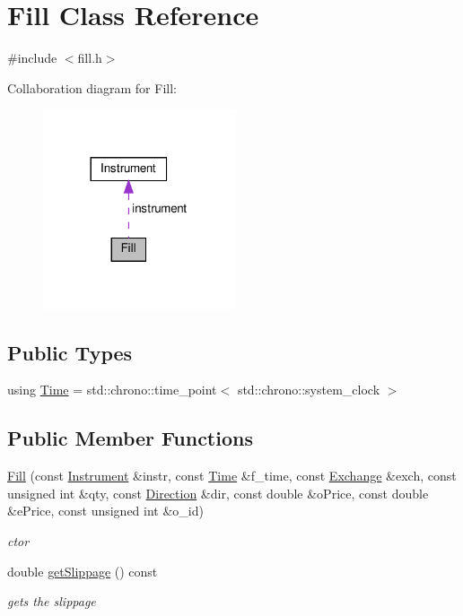 \hypertarget{classFill}{}\section{Fill Class Reference}
\label{classFill}


{\ttfamily \#include $<$fill.\+h$>$}



Collaboration diagram for Fill\+:\nopagebreak
\begin{figure}[H]
\begin{center}
\leavevmode
\includegraphics[width=161pt]{classFill__coll__graph}
\end{center}
\end{figure}
\subsection*{Public Types}
\begin{DoxyCompactItemize}
\item 
using \hyperlink{classFill_ab2f91079415160baf6bae4ce4e651882}{Time} = std\+::chrono\+::time\+\_\+point$<$ std\+::chrono\+::system\+\_\+clock $>$
\end{DoxyCompactItemize}
\subsection*{Public Member Functions}
\begin{DoxyCompactItemize}
\item 
\hyperlink{classFill_ac7abcfc5d69d92624d820ac2c54b26a9}{Fill} (const \hyperlink{classInstrument}{Instrument} \&instr, const \hyperlink{classFill_ab2f91079415160baf6bae4ce4e651882}{Time} \&f\+\_\+time, const \hyperlink{fill_8h_a0735734beae0a6b094ce815e727eeca0}{Exchange} \&exch, const unsigned int \&qty, const \hyperlink{fill_8h_a224b9163917ac32fc95a60d8c1eec3aa}{Direction} \&dir, const double \&o\+Price, const double \&e\+Price, const unsigned int \&o\+\_\+id)
\begin{DoxyCompactList}\small\item\em ctor \end{DoxyCompactList}\item 
double \hyperlink{classFill_afc13ac8bde0a76cb798f5fc9a62014fd}{get\+Slippage} () const
\begin{DoxyCompactList}\small\item\em gets the slippage \end{DoxyCompactList}\end{DoxyCompactItemize}
